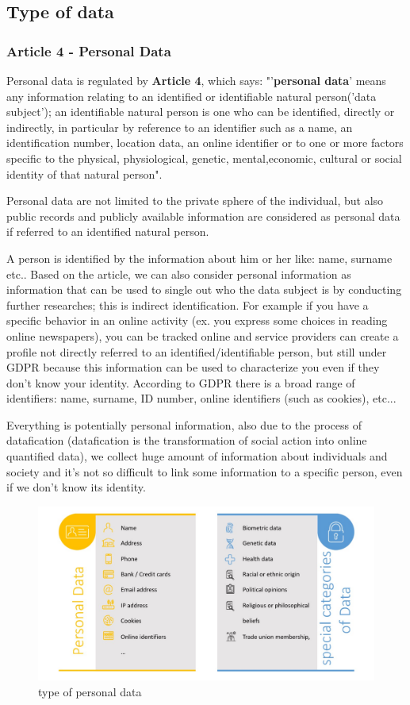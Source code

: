 \subsection{Type of data}
\subsubsection{Article 4 - Personal Data}
Personal data is regulated by \textbf{Article 4}, which says: "'\textbf{personal data}' means any information relating to an identified or identifiable natural person('data subject'); an identifiable natural person is one who can be identified, directly or indirectly, in particular by reference to an identifier such as a name, an identification number, location data, an online identifier or to one or more factors specific to the physical, physiological, genetic, mental,economic, cultural or social identity of that natural person".

Personal data are not limited to the private sphere of the individual, but also public records and publicly available information are considered as personal data if referred to an identified natural person.

A person is identified by the information about him or her like: name, surname etc.. Based on the article, we can also consider personal information as information that can be used to single out who the data subject is by conducting further researches; this is indirect identification. For example if you have a specific behavior in an online activity (ex. you express some choices in reading online newspapers), you can be tracked online and service providers can create a profile not directly referred to an identified/identifiable person, but still under GDPR because this information can be used to characterize you even if they don’t know your identity. According to GDPR there is a broad range of identifiers: name, surname, ID number, online identifiers (such as cookies), etc...

Everything is potentially personal information, also due to the process of datafication (datafication is the transformation of social action into online quantified data), we collect huge amount of information about individuals and society and it’s not so difficult to link some information to a specific person, even if we don’t know its identity.
\begin{figure}[h]
    \centering
    \includegraphics[width=12cm]{Images/personal data.jpg}
    \caption{type of personal data}
\end{figure}

